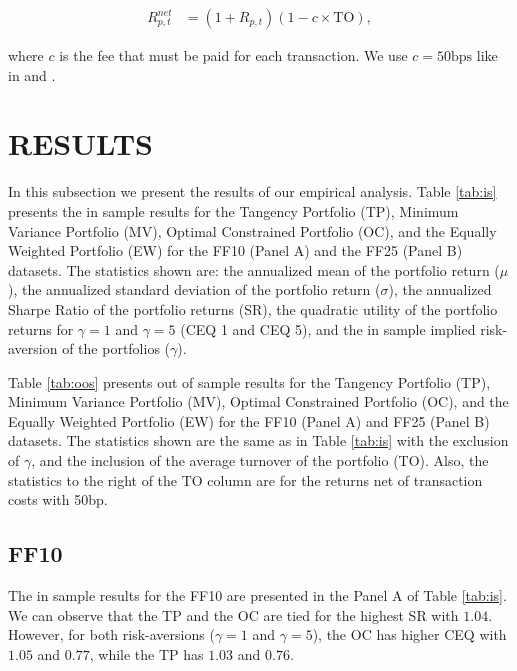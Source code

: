\documentclass[12pt,oneside,a4paper]{memoir}
\begin{document}
\vspace{-12pt}
\begin{align}
	R^{net}_{p,t} &= (1 + R_{p,t} )(1 - c\times \mathrm{TO}),
\end{align}

\noindent
where $c$ is the fee that must be paid for each transaction. We use $c=50\mathrm{bps}$ like in  and .

\section{RESULTS}

In this subsection we present the results of our empirical analysis. Table \ref{tab:is} presents the in sample results for the Tangency Portfolio (TP), Minimum Variance Portfolio (MV), Optimal Constrained Portfolio (OC), and the Equally Weighted Portfolio (EW) for the FF10 (Panel A) and the FF25 (Panel B) datasets. The statistics shown are:  the annualized mean of the portfolio return ($\mu$), the annualized standard deviation of the portfolio return ($\sigma$), the annualized Sharpe Ratio of the portfolio returns (SR),  the quadratic utility of the portfolio returns for $\gamma=1$ and $\gamma=5$ (CEQ 1 and CEQ 5), and the in sample implied risk-aversion of the portfolios ($\gamma$).

Table \ref{tab:oos} presents out of sample results for the Tangency Portfolio (TP), Minimum Variance Portfolio (MV), Optimal Constrained Portfolio (OC), and the Equally Weighted Portfolio (EW) for the FF10 (Panel A) and FF25 (Panel B) datasets.
The statistics shown are the same as in Table \ref{tab:is} with the exclusion of $\gamma$, and the inclusion of the average turnover of the portfolio (TO).
Also, the statistics to the right of the TO column are for the returns net of transaction costs with 50bp.

\subsection*{FF10}

The in sample results for the FF10 are presented in the Panel A of Table \ref{tab:is}. We can observe that the TP and the OC are tied for the highest SR with $1.04$. However, for both risk-aversions ($\gamma=1$ and $\gamma=5$), the OC has higher CEQ with $1.05$ and $0.77$, while the TP has $1.03$ and $0.76$.
\end{document}
